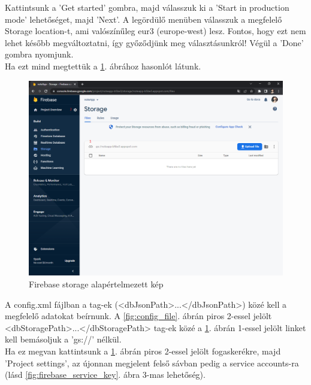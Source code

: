 \noindent Kattintsunk a 'Get started' gombra, majd válasszuk ki a 'Start in production mode' lehetőséget, majd 'Next'. A legördülő menüben válasszuk a megfelelő Storage location-t, ami valószínűleg eur3 (europe-west) lesz. Fontos, hogy ezt nem lehet később megváltoztatni, így győződjünk meg választásunkról! Végül a 'Done' gombra nyomjunk.
\vspace{5pt}\\Ha ezt mind megtettük a \ref{fig:firebase_storage_default}. ábrához hasonlót látunk.

\begin{figure}[H]
	\centering
	\includegraphics[scale=0.3]{images/config_4.png}
	\caption{Firebase storage alapértelmezett kép}
	\label{fig:firebase_storage_default}
\end{figure}


\noindent A config.xml fájlban a tag-ek (<dbJsonPath>...</dbJsonPath>) közé kell a megfelelő adatokat beírnunk. A \ref{fig:config_file}. ábrán piros 2-essel jelölt <dbStoragePath>...</dbStoragePath> tag-ek közé a \ref{fig:firebase_storage_default}. ábrán 1-essel jelölt linket kell bemásoljuk a 'gs://' nélkül.
\vspace{5pt}\\Ha ez megvan kattintsunk a \ref{fig:firebase_storage_default}. ábrán piros 2-essel jelölt fogaskerékre, majd 'Project settings', az újonnan megjelent felső sávban pedig a service accounts-ra (lásd \ref{fig:firebase_service_key}. ábra 3-mas lehetőség).

